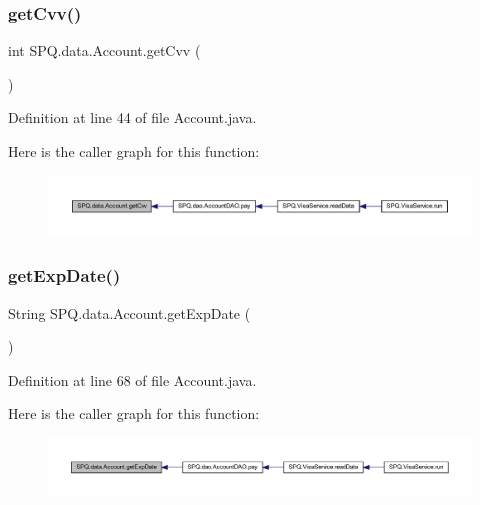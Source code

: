 \subsubsection{\texorpdfstring{get\+Cvv()}{getCvv()}}
{\footnotesize\ttfamily int S\+P\+Q.\+data.\+Account.\+get\+Cvv (\begin{DoxyParamCaption}{ }\end{DoxyParamCaption})}



Definition at line 44 of file Account.\+java.

Here is the caller graph for this function\+:\nopagebreak
\begin{figure}[H]
\begin{center}
\leavevmode
\includegraphics[width=350pt]{class_s_p_q_1_1data_1_1_account_a6f30fcec03cf6e342b7c6d932166ebb1_icgraph}
\end{center}
\end{figure}
\mbox{\label{class_s_p_q_1_1data_1_1_account_a6980881f5f4cd0af58f6ccdc8d6916fc}} 
\subsubsection{\texorpdfstring{get\+Exp\+Date()}{getExpDate()}}
{\footnotesize\ttfamily String S\+P\+Q.\+data.\+Account.\+get\+Exp\+Date (\begin{DoxyParamCaption}{ }\end{DoxyParamCaption})}



Definition at line 68 of file Account.\+java.

Here is the caller graph for this function\+:\nopagebreak
\begin{figure}[H]
\begin{center}
\leavevmode
\includegraphics[width=350pt]{class_s_p_q_1_1data_1_1_account_a6980881f5f4cd0af58f6ccdc8d6916fc_icgraph}
\end{center}
\end{figure}
\mbox{\label{class_s_p_q_1_1data_1_1_account_a7ac2f177ba411765320259ed3a63b5b2}} 
